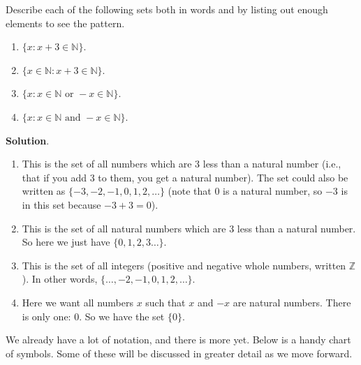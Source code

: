 \documentclass[11pt,]{book}
\theoremstyle{ptxplainnotitle}
\theoremstyle{ptxplaintitle}
\theoremstyle{ptxdefinitionnotitle}
\theoremstyle{ptxdefinitiontitle}
\theoremstyle{ptxdefinitionnotitle}
\theoremstyle{ptxdefinitiontitle}
\theoremstyle{ptxdefinitionnotitle}
\theoremstyle{ptxdefinitiontitle}
\theoremstyle{ptxdefinitiontitlenonumber}
\theoremstyle{ptxdefinitiontitlenonumber}
\numberwithin{equation}{chapter}
\newcommand{\N}{\mathbb N}
\newcommand{\Z}{\mathbb Z}
\newcommand{\st}{:}
\begin{document}
\begin{example}\label{example-28}
\hypertarget{p-673}{}%
Describe each of the following sets both in words and by listing out enough elements to see the pattern.%
\par
\hypertarget{p-674}{}%
\leavevmode%
\begin{enumerate}
\item\hypertarget{li-253}{}\(\{x \st x + 3 \in \N\}\).%
\item\hypertarget{li-254}{}\(\{x \in \N \st x + 3 \in \N\}\).%
\item\hypertarget{li-255}{}\(\{x \st x \in \N \text{ or } -x \in \N\}\).%
\item\hypertarget{li-256}{}\(\{x \st x \in \N \text{ and } -x \in \N\}\).%
\end{enumerate}
%
\par\smallskip%
\noindent\textbf{Solution}.\hypertarget{solution-94}{}\quad%
\hypertarget{p-675}{}%
\leavevmode%
\begin{enumerate}
\item\hypertarget{li-257}{}\hypertarget{p-676}{}%
This is the set of all numbers which are 3 less than a natural number (i.e., that if you add 3 to them, you get a natural number). The set could also be written as \(\{-3, -2, -1, 0, 1, 2, \ldots\}\) (note that 0 is a natural number, so \(-3\) is in this set because \(-3 + 3 = 0\)).%
\item\hypertarget{li-258}{}\hypertarget{p-677}{}%
This is the set of all natural numbers which are 3 less than a natural number. So here we just have \(\{0, 1, 2,3 \ldots\}\).%
\item\hypertarget{li-259}{}\hypertarget{p-678}{}%
This is the set of all integers  (positive and negative whole numbers, written \(\Z\)). In other words, \(\{\ldots, -2, -1, 0, 1, 2, \ldots\}\).%
\item\hypertarget{li-260}{}\hypertarget{p-679}{}%
Here we want all numbers \(x\) such that \(x\) and \(-x\) are natural numbers. There is only one: 0. So we have the set \(\{0\}\).%
\end{enumerate}
%
\end{example}
\hypertarget{p-680}{}%
We already have a lot of notation, and there is more yet. Below is a handy chart of symbols. Some of these will be discussed in greater detail as we move forward.%
\end{document}
